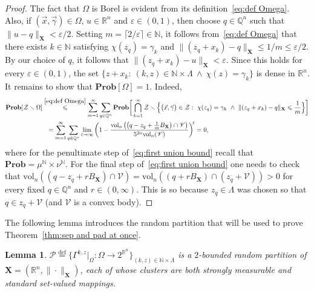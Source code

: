 \documentclass[11pt,reqno]{amsart}
\renewcommand{\le}{\leqslant}
\renewcommand{\setminus}{\smallsetminus}
\newcommand{\X}{\mathbf X}
\newcommand{\e}{\varepsilon}
\newcommand{\R}{\mathbb R}
\newtheorem{lemma}[theorem]{Lemma}
\theoremstyle{remark}
\newcommand{\N}{\mathbb N}
\newcommand{\eqdef}{\stackrel{\mathrm{def}}{=}}
\renewcommand{\Pr}{\mathbf{Prob}}
\newcommand{\vol}{\mathrm{vol}}
\renewcommand{\1}{\mathbf 1}
\newcommand{\Part}{\mathscr{P}}
\newcommand{\ZZ}{\mathcal{Z}}
\newcommand{\Q}{\mathbb{Q}}
\newcommand{\DD}{\mathscr{V}}
\begin{document}
\begin{proof}
The fact that $\Omega$ is Borel is evident  from its definition~\eqref{eq:def Omega}. Also, if $(\vec{x},\vec{\gamma})\in \Omega$, $u\in \R^n$ and $\e\in (0,1)$, then choose $q\in \Q^n$ such that $\|u-q\|_{\X}<\e/2$. Setting $m=\lceil 2/\e\rceil\in \N$, it follows from~\eqref{eq:def Omega} that there exists $k\in \N$ satisfying $\chi(z_q)=\gamma_k$ and $\|(z_q+x_k)-q\|_{\X}\le 1/m\le
\e/2$. By our choice of $q$, it follows that $\|(z_q+x_k)-u\|_{\X}<\e$. Since this holds for every $\e\in (0,1)$, the set $\{z+x_k:\ (k,z)\in \N\times \Lambda\ \wedge\  \chi(z)=\gamma_k\}$  is dense in $\R^n$. It remains to show that $\Pr[\Omega]=1$. Indeed,
\begin{align}\label{eq:first union bound}
\begin{split}
\Pr[\ZZ\setminus \Omega]&\stackrel{\eqref{eq:def Omega}}{\le} \sum_{m=1}^\infty \sum_{q\in \Q^n}\Pr\bigg[\bigcap_{k=1}^\infty \ZZ\setminus \Big\{\big(\vec{x},\vec{\gamma}\big)\in
\ZZ:\ \chi(z_q)= \gamma_k\ \wedge\ \|(z_q+x_k)-q\|_{\X}\le \frac{1}{m}\Big\}\bigg]
\\&\ \ =\sum_{m=1}^\infty \sum_{q\in \Q^n} \lim_{\ell\to \infty} \bigg(1-\frac{\vol_n\left( \left(q-z_q+\frac{1}{m}B_{\X}\right)\cap\DD\right)}{5^{2n}\vol_n(\DD)}\bigg)^{\!\ell}=0,
\end{split}
\end{align}
where for the penultimate step of~\eqref{eq:first union bound} recall that $\Pr=\mu^\N\times \nu^\N$. For the final step of~\eqref{eq:first union bound}  one needs to check that $\vol_n((q-z_q+rB_{\X})\cap \DD)=\vol_n((q+rB_{\X})\cap (z_q+\DD))>0$ for every fixed $q\in \Q^n$ and $r\in (0,\infty)$. This is so because $z_q\in \Lambda$ was chosen so that $q\in z_q+\DD$ (and $\DD$ is a convex body).
\end{proof}

The following lemma introduces the random partition that will be used to prove Theorem~\ref{thm:sep and pad at once}.

\begin{lemma}\label{lem:is a bounded partition} $\Part\eqdef \{\Gamma^{k,z}|_\Omega:\Omega\to 2^{\R^n}\}_{(k,z)\in \N\times \Lambda}$ is a $2$-bounded random partition of $\X=(\R^n,\|\cdot\|_{\X})$, each of whose clusters are both strongly measurable and standard set-valued mappings.
\end{lemma}
\end{document}
